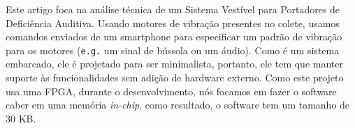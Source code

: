 \documentclass{sig-alternate-05-2015}
\begin{document}
%
\author{
%
%
\alignauthor Caique R. Marques
    \\
    \\
\alignauthor Lucas R. Neis \\
    \\
    \\
\alignauthor Rafael L. Cancian \\
    \\
    \\
\and %
\alignauthor Roberto A. P. Martins \\
    \\
    \\
}

\maketitle
\begin{resumo}
    Este artigo foca na análise técnica de um Sistema Vestível para Portadores
    de Deficiência Auditiva. Usando motores de vibração presentes no colete,
    usamos comandos enviados de um smartphone para especificar um padrão de
    vibração para os motores (\texttt{e.g.} um sinal de bússola ou um áudio).
    Como é um sistema embarcado, ele é projetado para ser minimalista,
    portanto, ele tem que manter suporte às funcionalidades sem adição de
    hardware externo. Como este projeto usa uma FPGA, durante o
    desenvolvimento, nós focamos em fazer o software caber em uma memória
    \textit{in-chip}, como resultado, o software tem um tamanho de 30 KB.
\end{resumo}
\end{document}
